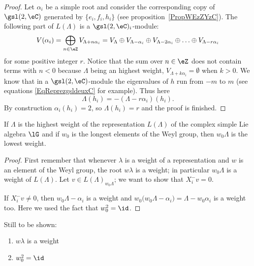 \begin{proof}
	Let \( \alpha_i\) be a simple root and consider the corresponding copy of \( \gsl(2,\eC)\) generated by \( \{ e_i,f_i,h_i \}\) (see proposition~\ref{PropWEzZYzC}). The following part of \( L(\Lambda)\) is a \( \gsl(2,\eC)_i\)-module:
	\begin{equation}
		V(\alpha_i)=\bigoplus_{n\in\eZ}V_{\Lambda+n\alpha_i}=V_{\Lambda}\oplus V_{\Lambda-\alpha_i}\oplus V_{\Lambda-2\alpha_i}\oplus\ldots\oplus V_{\Lambda-r\alpha_i}
	\end{equation}
	for some positive integer \( r\). Notice that the sum over \( n\in\eZ\) does not contain terms with \( n<0\) because \( \Lambda\) being an highest weight, \( V_{\Lambda+k\alpha_i}=\emptyset\) when \( k>0\). We know that in a \( \gsl(2,\eC)\)-module the eigenvalues of \( h\) run from \( -m\) to \( m\) (see equations \eqref{EqReprezgsldeuxC} for example). Thus here
	\begin{equation}
		\Lambda(h_i)=-(\Lambda-r\alpha_i)(h_i).
	\end{equation}
	By construction \( \alpha_i(h_i)=2\), so \( \Lambda(h_i)=r\) and the proof is finished.
\end{proof}

\begin{proposition}
	If \( \Lambda\) is the highest weight of the representation \( L(\Lambda)\) of the complex simple Lie algebra \( \lG\) and if \( w_0\) is the longest elements of the Weyl group, then \( w_0\Lambda\) is the lowest weight.
\end{proposition}

\begin{proof}
	First remember that whenever \( \lambda\) is a weight of a representation and \( w\) is an element of the Weyl group, the root \( w\lambda\) is a weight; in particular \( w_0\Lambda\) is a weight of \( L(\Lambda)\).   Let \( v\in L(\Lambda)_{w_0\Lambda}\); we want to show that \( X_i^-v=0\).

	If \( X_i^-v\neq 0\), then \( w_0\Lambda-\alpha_i\) is a weight and \( w_0\big( w_0\Lambda-\alpha_i \big)=\Lambda-w_0\alpha_i\) is a weight too. Here we used the fact that \( w_0^2=\id\).
\end{proof}

\begin{probleme}
	Still to be shown:
	\begin{enumerate}
		\item
		      \( w\lambda\) is a weight
		\item
		      \( w_0^2=\id\)
	\end{enumerate}
\end{probleme}


